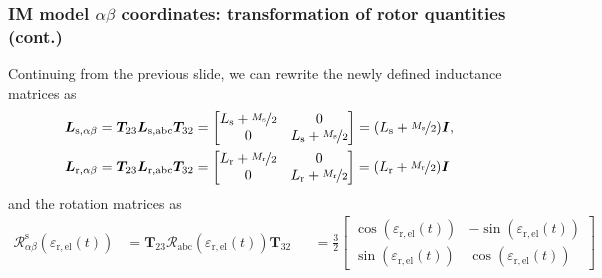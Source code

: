 \begin{frame}
	\frametitle{IM model $\alpha\beta$ coordinates: transformation of rotor quantities (cont.)}
	Continuing from the previous slide, we can rewrite the newly defined inductance matrices as
	\begin{equation}
		\begin{split}
			\bm{L}_{\mathrm{s},\alpha\beta} & = \bm{T}_{23} \bm{L}_{\mathrm{s,abc}}\bm{T}_{32} = \begin{bmatrix}
				                                                                                     L_\mathrm{s} +\nicefrac{M_\mathrm{s}}{2} & 0 \\ 0 &  L_\mathrm{s} +\nicefrac{M_\mathrm{s}}{2}
			                                                                                     \end{bmatrix} = (L_\mathrm{s} +\nicefrac{M_\mathrm{s}}{2}) \bm{I}, \\
			\bm{L}_{\mathrm{r},\alpha\beta} & = \bm{T}_{23} \bm{L}_{\mathrm{r,abc}}\bm{T}_{32} = \begin{bmatrix}
				                                                                                     L_\mathrm{r} +\nicefrac{M_\mathrm{r}}{2} & 0 \\ 0 &  L_\mathrm{r} +\nicefrac{M_\mathrm{r}}{2}
			                                                                                     \end{bmatrix}= (L_\mathrm{r} +\nicefrac{M_\mathrm{r}}{2}) \bm{I}
		\end{split}
		\label{eq:IM_model_alpha_beta_inductance_matrices}
	\end{equation}
	and the rotation matrices as
	\begin{equation}
		\renewcommand{\arraystretch}{1.15}
		\begin{alignedat}{2}
			\bm{\mathcal{R}}^\mathrm{s}_{\alpha\beta}(\varepsilon_\mathrm{r,el}(t)) & = \bm{T}_{23}\bm{\mathcal{R}}_\mathrm{abc}(\varepsilon_\mathrm{r,el}(t))\bm{T}_{32}   &  & = \frac{3}{2}\begin{bmatrix}
				                                                                                                                                                                                  \cos(\varepsilon_\mathrm{r,el}(t)) & -\sin(\varepsilon_\mathrm{r,el}(t)) \\
				                                                                                                                                                                                  \sin(\varepsilon_\mathrm{r,el}(t)) & \cos(\varepsilon_\mathrm{r,el}(t))

\end{bmatrix}
\end{alignedat}
\end{equation}
\end{frame}
